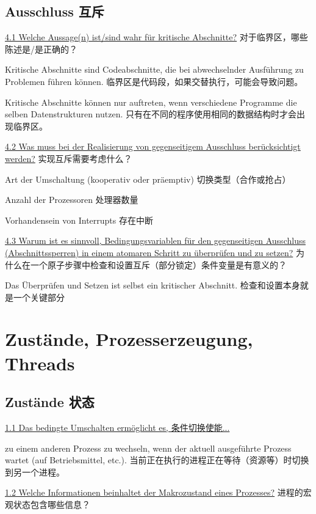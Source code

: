 \documentclass[fleqn]{article}
\begin{document}
\subsection{Ausschluss 互斥}

\noindent\uline{4.1 Welche Aussage(n) ist/sind wahr für kritische Abschnitte?}
对于临界区，哪些陈述是/是正确的？

Kritische Abschnitte sind Codeabschnitte, die bei abwechselnder Ausführung zu Problemen führen können.
临界区是代码段，如果交替执行，可能会导致问题。

Kritische Abschnitte können nur auftreten, wenn verschiedene Programme die selben Datenstrukturen nutzen.
只有在不同的程序使用相同的数据结构时才会出现临界区。

\noindent\uline{4.2 Was muss bei der Realisierung von gegenseitigem Ausschluss berücksichtigt werden?}
实现互斥需要考虑什么？

Art der Umschaltung (kooperativ oder präemptiv)
切换类型（合作或抢占）

Anzahl der Prozessoren
处理器数量

Vorhandensein von Interrupts
存在中断

\noindent\uline{4.3 Warum ist es sinnvoll, Bedingungsvariablen für den gegenseitigen Ausschluss (Abschnittssperren) in einem atomaren Schritt zu überprüfen und zu setzen?}
为什么在一个原子步骤中检查和设置互斥（部分锁定）条件变量是有意义的？

Das Überprüfen und Setzen ist selbst ein kritischer Abschnitt. 检查和设置本身就是一个关键部分



\section{Zustände, Prozesserzeugung, Threads}

\subsection{Zustände 状态}

\noindent\uline{1.1	Das bedingte Umschalten ermöglicht es, 条件切换使能...}

zu einem anderen Prozess zu wechseln, wenn der aktuell ausgeführte Prozess wartet (auf Betriebsmittel, etc.).
当前正在执行的进程正在等待（资源等）时切换到另一个进程。

\noindent\uline{1.2 Welche Informationen beinhaltet der Makrozustand eines Prozesses?}
进程的宏观状态包含哪些信息？
\end{document}
